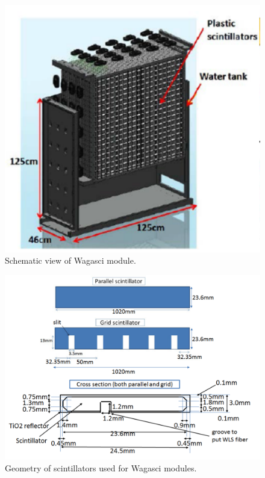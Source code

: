 \begin{figure}[tbh]
\begin{center}
\includegraphics[width=0.6\linewidth]{fig/wagasci_mod.pdf}
\end{center}
\caption{
Schematic view of Wagasci module.
}
\label{fig:wagasci_mod}
\end{figure}

\begin{figure}[tbh]
\begin{center}
\includegraphics[width=0.8\linewidth]{fig/wagasci_scinti_geometry.pdf}
\end{center}
\caption{
Geometry of scintillators used for Wagasci modules.
}
\label{fig:wagasci_scinti_geometry}
\end{figure}

